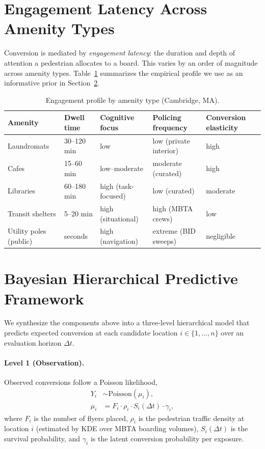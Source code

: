 \documentclass[sigconf,nonacm]{acmart}
\begin{document}
\section{Engagement Latency Across Amenity Types}
\label{sec:latency}

Conversion is mediated by \emph{engagement latency}: the duration and depth of attention a pedestrian allocates to a board. This varies by an order of magnitude across amenity types. Table~\ref{tab:latency} summarizes the empirical profile we use as an informative prior in Section~\ref{sec:bhm}.

\begin{table}[t]
    \centering
    \small
    \caption{Engagement profile by amenity type (Cambridge, MA).}
    \label{tab:latency}
    \begin{tabular}{lllll}
        \toprule
        Amenity & Dwell time & Cognitive focus & Policing frequency & Conversion elasticity \\
        \midrule
        Laundromats & 30--120 min & low & low (private interior) & high \\
        Cafes & 15--60 min & low--moderate & moderate (curated) & high \\
        Libraries & 60--180 min & high (task-focused) & low (curated) & moderate \\
        Transit shelters & 5--20 min & high (situational) & high (MBTA crews) & low \\
        Utility poles (public) & seconds & high (navigation) & extreme (BID sweeps) & negligible \\
        \bottomrule
    \end{tabular}
\end{table}

\section{Bayesian Hierarchical Predictive Framework}
\label{sec:bhm}

We synthesize the components above into a three-level hierarchical model that predicts expected conversion at each candidate location $i \in \{1, \dots, n\}$ over an evaluation horizon $\Delta t$.

\paragraph{Level 1 (Observation).} Observed conversions follow a Poisson likelihood,
\begin{align}
    Y_i &\sim \text{Poisson}(\mu_i), \\
    \mu_i &= F_i \cdot \rho_i \cdot S_i(\Delta t) \cdot \gamma_i,
\end{align}
where $F_i$ is the number of flyers placed, $\rho_i$ is the pedestrian traffic density at location $i$ (estimated by KDE over MBTA boarding volumes), $S_i(\Delta t)$ is the survival probability, and $\gamma_i$ is the latent conversion probability per exposure.
\end{document}
